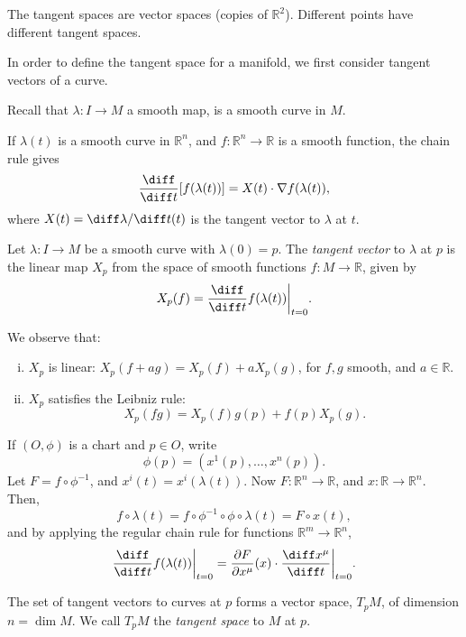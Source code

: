 \documentclass[12pt]{article}
\begin{document}
The tangent spaces are vector spaces (copies of $\mathbb{R}^2$). Different points have different tangent spaces.

In order to define the tangent space for a manifold, we first consider tangent vectors of a curve.

Recall that $\lambda : I \to M$ a smooth map, is a smooth curve in $M$.

If $\lambda(t)$ is a smooth curve in $\mathbb{R}^n$, and $f : \mathbb{R}^n \to \mathbb{R}$ is a smooth function, the chain rule gives
\[
	\frac{\diff}{\diff t} [f(\lambda(t))] = X(t) \cdot \nabla f(\lambda(t)),
\]
where $X(t) = \diff \lambda / \diff t (t)$ is the tangent vector to $\lambda$ at $t$.

\begin{definition}
	Let $\lambda : I \to M$ be a smooth curve with $\lambda(0) = p$. The \emph{tangent vector} to $\lambda$ at $p$ is the linear map $X_p$ from the space of smooth functions $f : M \to \mathbb{R}$, given by
	\[
	X_p(f) = \frac{\diff}{\diff t} f(\lambda(t)) \biggr|_{t = 0}.
	\]
\end{definition}

We observe that:
\begin{enumerate}[(i)]
	\item $X_p$ is linear: $X_p(f + a g) = X_p(f) + a X_p (g)$, for $f, g$ smooth, and $a \in \mathbb{R}$.
	\item $X_p$ satisfies the Leibniz rule:
		\[
		X_p(fg) = X_p(f) g(p) + f(p) X_p(g).
		\]
\end{enumerate}

If $(O, \phi)$ is a chart and $p \in O$, write
\[
\phi(p) = (x^1(p), \ldots, x^n(p)).
\]
Let $F = f \circ \phi^{-1}$, and $x^i(t) = x^i(\lambda(t))$. Now $F : \mathbb{R}^n \to \mathbb{R}$, and $x : \mathbb{R} \to \mathbb{R}^n$. Then,
\[
f \circ \lambda(t) = f \circ \phi^{-1} \circ \phi \circ \lambda(t) = F \circ x(t),
\]
and by applying the regular chain rule for functions $\mathbb{R}^m \to \mathbb{R}^n$,
\[
\frac{\diff}{\diff t} f(\lambda(t)) \biggr|_{t = 0} = \frac{\partial F}{\partial x^\mu} (x) \cdot \frac{\diff x^\mu}{\diff t} \biggr|_{t = 0}.
\]


\begin{proposition}
	The set of tangent vectors to curves at $p$ forms a vector space, $T_pM$, of dimension $n = \dim M$. We call $T_p M$ the \emph{tangent space} to $M$ at $p$.
\end{proposition}
\end{document}
